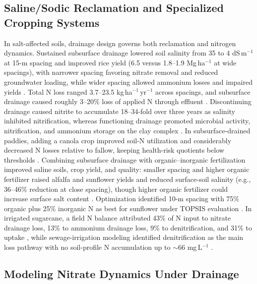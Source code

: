 \subsection{Saline/Sodic Reclamation and Specialized Cropping Systems}

In salt-affected soils, drainage design governs both reclamation and nitrogen dynamics. Sustained subsurface drainage lowered soil salinity from 35 to 4 dS\,m$^{-1}$ at 15-m spacing and improved rice yield (6.5 versus 1.8--1.9 Mg\,ha$^{-1}$ at wide spacings), with narrower spacing favoring nitrate removal and reduced groundwater loading, while wider spacing allowed ammonium losses and impaired yields \parencite{Singh2002,Singh2001c}. Total N loss ranged 3.7--23.5 kg\,ha$^{-1}$\,yr$^{-1}$ across spacings, and subsurface drainage caused roughly 3--20\% loss of applied N through effluent \parencite{Singh2002}. Discontinuing drainage caused nitrite to accumulate 18--34-fold over three years as salinity inhibited nitrification, whereas functioning drainage promoted microbial activity, nitrification, and ammonium storage on the clay complex \parencite{Singh2007}. In subsurface-drained paddies, adding a canola crop improved soil-N utilization and considerably decreased N losses relative to fallow, keeping health-risk quotients below thresholds \parencite{DarziNaftchali2017}. Combining subsurface drainage with organic--inorganic fertilization improved saline soils, crop yield, and quality: smaller spacing and higher organic fertilizer raised alfalfa and sunflower yields and reduced surface-soil salinity (e.g., 36--46\% reduction at close spacing), though higher organic fertilizer could increase surface salt content \parencite{Zhang2024d,Zhai2023}. Optimization identified 10-m spacing with 75\% organic plus 25\% inorganic N as best for sunflower under TOPSIS evaluation \parencite{Zhu2025}. In irrigated sugarcane, a field N balance attributed 43\% of N input to nitrate drainage loss, 13\% to ammonium drainage loss, 9\% to denitrification, and 31\% to uptake \parencite{Matinzadeh2017}, while sewage-irrigation modeling identified denitrification as the main loss pathway with no soil-profile N accumulation up to $\sim$66 mg\,L$^{-1}$ \parencite{Yang2008}.

\subsection{Modeling Nitrate Dynamics Under Drainage}

